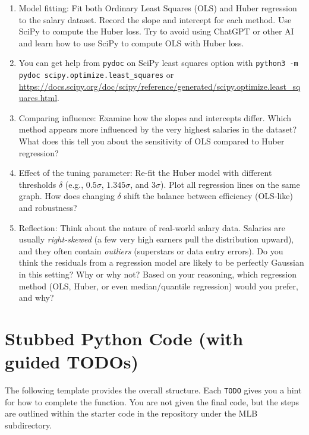 \documentclass[10pt]{article}
\begin{document}
\begin{enumerate}[leftmargin=1.5em]
\item Model fitting: Fit both Ordinary Least Squares (OLS) and Huber regression to the salary dataset. Record the slope and intercept for each method.  Use SciPy to compute the Huber loss.  Try to avoid using ChatGPT or other AI and learn how to use SciPy to compute OLS with Huber loss.
\item  You can get help from \verb!pydoc! on SciPy least squares option with \verb!python3 -m pydoc scipy.optimize.least_squares! or \url{https://docs.scipy.org/doc/scipy/reference/generated/scipy.optimize.least_squares.html}.
\item Comparing influence: Examine how the slopes and intercepts differ. Which method appears more influenced by the very highest salaries in the dataset? What does this tell you about the sensitivity of OLS compared to Huber regression?  
\item Effect of the tuning parameter: Re-fit the Huber model with different thresholds $\delta$ (e.g., $0.5\sigma$, $1.345\sigma$, and $3\sigma$). Plot all regression lines on the same graph. How does changing $\delta$ shift the balance between efficiency (OLS-like) and robustness?  
\item Reflection: Think about the nature of real-world salary data. Salaries are usually \emph{right-skewed} (a few very high earners pull the distribution upward), and they often contain \emph{outliers} (superstars or data entry errors). Do you think the residuals from a regression model are likely to be perfectly Gaussian in this setting? Why or why not? Based on your reasoning, which regression method (OLS, Huber, or even median/quantile regression) would you prefer, and why?
\end{enumerate}

\section*{Stubbed Python Code (with guided TODOs)}

The following template provides the overall structure.  
Each \texttt{TODO} gives you a hint for how to complete the function.  
You are not given the final code, but the steps are outlined within the starter code in the repository under the MLB subdirectory.



\end{document}

